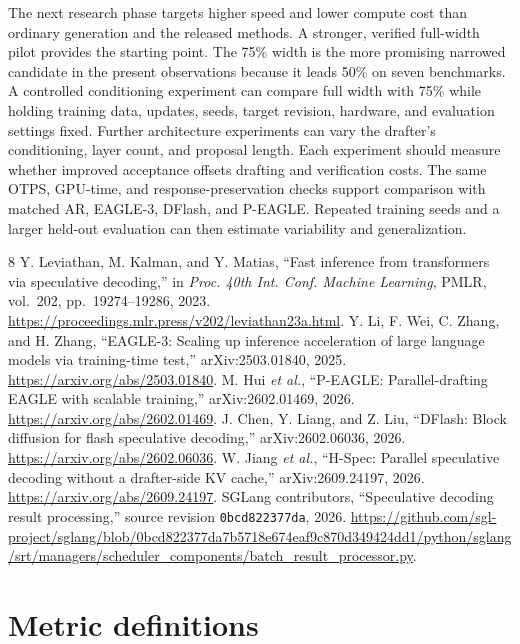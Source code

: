 \documentclass[conference,onecolumn]{IEEEtran}
\begin{document}
The next research phase targets higher speed and lower compute cost than ordinary generation and the released methods. A stronger, verified full-width pilot provides the starting point. The 75\% width is the more promising narrowed candidate in the present observations because it leads 50\% on seven benchmarks. A controlled conditioning experiment can compare full width with 75\% while holding training data, updates, seeds, target revision, hardware, and evaluation settings fixed. Further architecture experiments can vary the drafter's conditioning, layer count, and proposal length. Each experiment should measure whether improved acceptance offsets drafting and verification costs. The same OTPS, GPU-time, and response-preservation checks support comparison with matched AR, EAGLE-3, DFlash, and P-EAGLE. Repeated training seeds and a larger held-out evaluation can then estimate variability and generalization.

\begin{thebibliography}{8}
Y. Leviathan, M. Kalman, and Y. Matias, ``Fast inference from transformers via speculative decoding,'' in \emph{Proc. 40th Int. Conf. Machine Learning}, PMLR, vol.~202, pp.~19274--19286, 2023. \url{https://proceedings.mlr.press/v202/leviathan23a.html}.
Y. Li, F. Wei, C. Zhang, and H. Zhang, ``EAGLE-3: Scaling up inference acceleration of large language models via training-time test,'' arXiv:2503.01840, 2025. \url{https://arxiv.org/abs/2503.01840}.
M. Hui \emph{et al.}, ``P-EAGLE: Parallel-drafting EAGLE with scalable training,'' arXiv:2602.01469, 2026. \url{https://arxiv.org/abs/2602.01469}.
J. Chen, Y. Liang, and Z. Liu, ``DFlash: Block diffusion for flash speculative decoding,'' arXiv:2602.06036, 2026. \url{https://arxiv.org/abs/2602.06036}.
W. Jiang \emph{et al.}, ``H-Spec: Parallel speculative decoding without a drafter-side KV cache,'' arXiv:2609.24197, 2026. \url{https://arxiv.org/abs/2609.24197}.
SGLang contributors, ``Speculative decoding result processing,'' source revision \texttt{0bcd822377da}, 2026. \url{https://github.com/sgl-project/sglang/blob/0bcd822377da7b5718e674eaf9c870d349424dd1/python/sglang/srt/managers/scheduler_components/batch_result_processor.py}.
\end{thebibliography}

\clearpage
\appendices
\section{Metric definitions}

\end{document}

